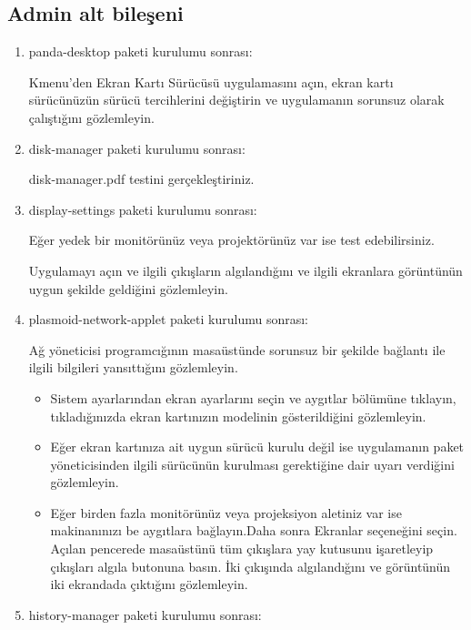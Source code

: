 \documentclass[a4paper,10pt]{article}
\begin{document}
\subsection*{Admin alt bileşeni}
\begin{enumerate} 

\item panda-desktop paketi kurulumu sonrası:

Kmenu'den Ekran Kartı Sürücüsü uygulamasını açın, ekran kartı sürücünüzün sürücü tercihlerini değiştirin ve uygulamanın sorunsuz olarak çalıştığını gözlemleyin.

\item disk-manager paketi kurulumu sonrası:

disk-manager.pdf testini gerçekleştiriniz.
% 
\item display-settings paketi kurulumu sonrası:
  
Eğer yedek bir monitörünüz veya projektörünüz var ise test edebilirsiniz.

Uygulamayı açın ve ilgili çıkışların algılandığını ve ilgili ekranlara görüntünün uygun şekilde geldiğini gözlemleyin.

\item plasmoid-network-applet paketi kurulumu sonrası:

Ağ yöneticisi programcığının masaüstünde sorunsuz bir şekilde bağlantı ile ilgili bilgileri yansıttığını gözlemleyin.

\begin{itemize}
\item Sistem ayarlarından ekran ayarlarını seçin ve aygıtlar bölümüne tıklayın, tıkladığınızda ekran kartınızın modelinin gösterildiğini gözlemleyin.

\item Eğer ekran kartınıza ait uygun sürücü kurulu değil ise uygulamanın paket yöneticisinden ilgili sürücünün kurulması gerektiğine dair uyarı verdiğini gözlemleyin.

\item Eğer birden fazla monitörünüz veya projeksiyon aletiniz var ise makinanınızı be aygıtlara bağlayın.Daha sonra Ekranlar seçeneğini seçin. Açılan pencerede masaüstünü tüm çıkışlara yay kutusunu işaretleyip çıkışları algıla butonuna basın. İki çıkışında algılandığını ve görüntünün iki ekrandada çıktığını gözlemleyin. 
\end{itemize}

 \item history-manager paketi kurulumu sonrası:


\end{enumerate}
\end{document}
